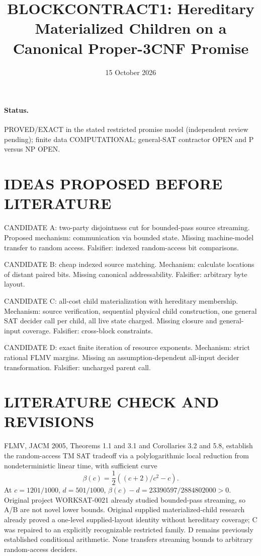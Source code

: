 \documentclass{article}
\title{BLOCKCONTRACT1: Hereditary Materialized Children on a Canonical Proper-3CNF Promise}
\date{15 October 2026}
\begin{document}
\maketitle
\paragraph{Status.} PROVED/EXACT in the stated restricted promise model (independent review pending); finite data COMPUTATIONAL; general-SAT contractor OPEN and P versus NP OPEN.
\section{IDEAS PROPOSED BEFORE LITERATURE}
CANDIDATE A: two-party disjointness cut for bounded-pass source streaming. Proposed mechanism: communication via bounded state. Missing machine-model transfer to random access. Falsifier: indexed random-access bit comparisons.
\par CANDIDATE B: cheap indexed source matching. Mechanism: calculate locations of distant paired bits. Missing canonical addressability. Falsifier: arbitrary byte layout.
\par CANDIDATE C: all-cost child materialization with hereditary membership. Mechanism: source verification, sequential physical child construction, one general SAT decider call per child, all live state charged. Missing closure and general-input coverage. Falsifier: cross-block constraints.
\par CANDIDATE D: exact finite iteration of resource exponents. Mechanism: strict rational FLMV margins. Missing an assumption-dependent all-input decider transformation. Falsifier: uncharged parent call.
\section{LITERATURE CHECK AND REVISIONS}
FLMV, JACM 2005, Theorems 1.1 and 3.1 and Corollaries 3.2 and 5.8, establish the random-access TM SAT tradeoff via a polylogarithmic local reduction from nondeterministic linear time, with sufficient curve
\[
\beta(c)=\frac12((c+2)/c^2-c).
\]
At $c=1201/1000$, $d=501/1000$, $\beta(c)-d=23390597/2884802000>0$. Original project WORKSAT-0021 already studied bounded-pass streaming, so A/B are not novel lower bounds. Original supplied materialized-child research already proved a one-level supplied-layout identity without hereditary coverage; C was repaired to an explicitly recognizable restricted family. D remains previously established conditional arithmetic. None transfers streaming bounds to arbitrary random-access deciders.
\end{document}
